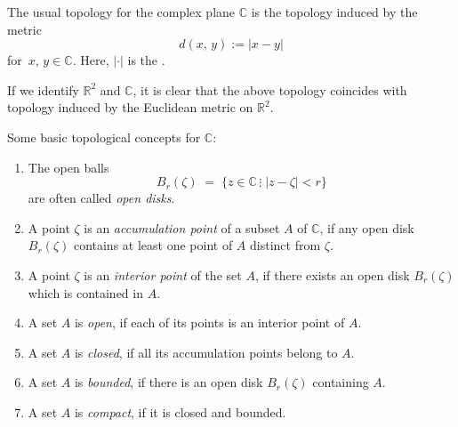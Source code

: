 \documentclass[12pt]{article}
\newcommand{\sR}[0]{\mathbb{R}}
\newcommand{\sC}[0]{\mathbb{C}}
\begin{document}
The usual topology for the complex plane $\sC$
is the topology induced by the metric 
$$d(x,\,y) := |x\!-\!y|$$
for\, $x,\,y \in \sC$.
Here, $|\cdot|$ is the .

If we identify $\sR^2$ and $\sC$, it is clear that the above
topology coincides with topology induced by the Euclidean metric on $\sR^2$.

Some basic topological concepts for $\sC$:
\begin{enumerate}
\item The open balls 
$$B_r(\zeta) \;=\; \{z\in\sC\,\vdots\; |z\!-\!\zeta| < r\}$$
are often called \emph{open disks}.
\item A point $\zeta$ is an \emph{accumulation point} of a subset $A$ of $\sC$, if any open disk $B_r(\zeta)$ contains at least one point of $A$ distinct from $\zeta$.
\item A point $\zeta$ is an \emph{interior point} of the set $A$, if there exists an open disk $B_r(\zeta)$ which is contained in $A$.
\item A set $A$ is \emph{open}, if each of its points is an interior point of $A$.
\item A set $A$ is \emph{closed}, if all its accumulation points belong to $A$.
\item A set $A$ is \emph{bounded}, if there is an open disk $B_r(\zeta)$ containing $A$.
\item A set $A$ is \emph{compact}, if it is closed and bounded.
\end{enumerate}
\end{document}
